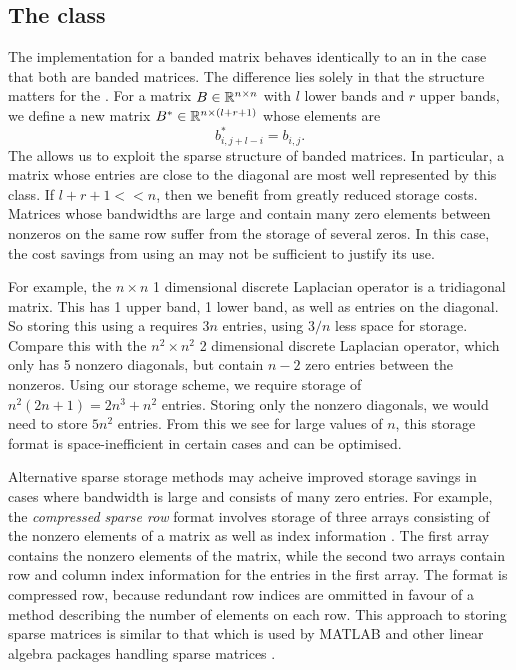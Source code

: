 \subsection{The  class}

The  implementation for a banded matrix behaves identically to an  in the case that both are banded matrices.
The difference lies solely in that the structure matters for the .
For a matrix $B\in\mathbb{R}^{n\times n}$ with $l$ lower bands and $r$ upper bands, we define a new matrix $B^*\in\mathbb{R}^{n \times (l+r+1)}$ whose elements are
\[
    b^*_{i,j+l-i} = b_{i,j}.
\]
The  allows us to exploit the sparse structure of banded matrices.
In particular, a matrix whose entries are close to the diagonal are most well represented by this class. 
If $l+r+1 << n$, then we benefit from greatly reduced storage costs.
Matrices whose bandwidths are large and contain many zero elements between nonzeros on the same row suffer from the storage of several zeros.
In this case, the cost savings from using an  may not be sufficient to justify its use.

For example, the $n\times n$ 1 dimensional discrete Laplacian operator is a tridiagonal matrix. 
This has 1 upper band, 1 lower band, as well as entries on the diagonal.
So storing this using a  requires $3n$ entries, using $3/n$ less space for storage.
Compare this with the $n^2\times n^2$ 2 dimensional discrete Laplacian operator, which only has 5 nonzero diagonals, but contain $n-2$ zero entries between the nonzeros.
Using our storage scheme, we require storage of $n^2(2n+1)=2n^3+n^2$ entries. 
Storing only the nonzero diagonals, we would need to store $5n^2$ entries.
From this we see for large values of $n$, this storage format is space-inefficient in certain cases and can be optimised.

Alternative sparse storage methods may acheive improved storage savings in cases where bandwidth is large and consists of many zero entries.
For example, the \textit{compressed sparse row} format involves storage of three arrays consisting of the nonzero elements of a matrix as well as index information \cite{csr}.
The first array contains the nonzero elements of the matrix, while the second two arrays contain row and column index information for the entries in the first array.
The format is compressed row, because redundant row indices are ommitted in favour of a method describing the number of elements on each row.
This approach to storing sparse matrices is similar to that which is used by MATLAB and other linear algebra packages handling sparse matrices \cite{matlabsp}.

